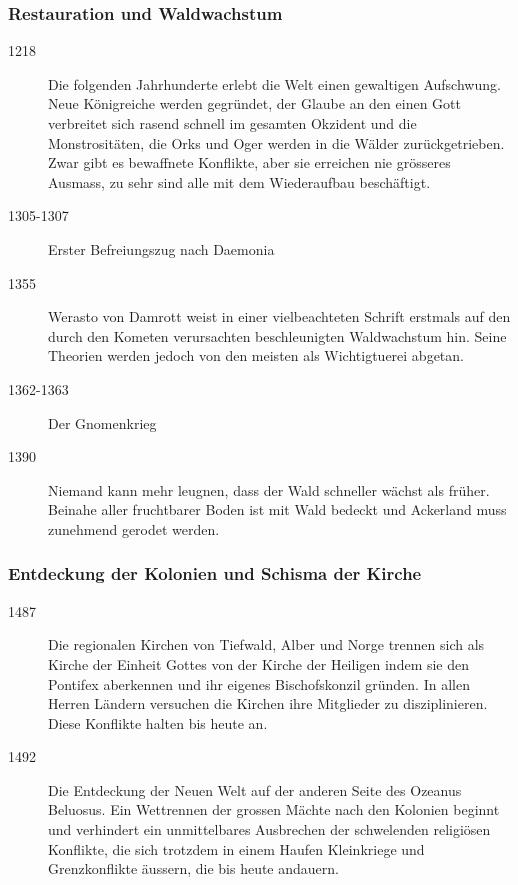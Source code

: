 \documentclass[12pt,twoside,twocolumn,openany]{book}
\begin{document}
	\subsubsection{Restauration und Waldwachstum}
	\begin{description}
		\item[1218] Die folgenden Jahrhunderte erlebt die Welt einen gewaltigen Aufschwung. Neue Königreiche werden gegründet, der Glaube an den einen Gott verbreitet sich rasend schnell im gesamten Okzident und die Monstrositäten, die Orks und Oger werden in die Wälder zurückgetrieben. Zwar gibt es bewaffnete Konflikte, aber sie erreichen nie grösseres Ausmass, zu sehr sind alle mit dem Wiederaufbau beschäftigt.
		\item[1305-1307] Erster Befreiungszug nach Daemonia
		\item[1355] Werasto von Damrott weist in einer vielbeachteten Schrift erstmals auf den durch den Kometen verursachten beschleunigten Waldwachstum hin. Seine Theorien werden jedoch von den meisten als Wichtigtuerei abgetan.
		\item[1362-1363] Der Gnomenkrieg
		\item[1390] Niemand kann mehr leugnen, dass der Wald schneller wächst als früher. Beinahe aller fruchtbarer Boden ist mit Wald bedeckt und Ackerland muss zunehmend gerodet werden.
	\end{description}
	
	\subsubsection{Entdeckung der Kolonien und Schisma der Kirche}
	\begin{description}
		\item[1487] Die regionalen Kirchen von Tiefwald, Alber und Norge trennen sich als Kirche der Einheit Gottes von der Kirche der Heiligen indem sie den Pontifex aberkennen und ihr eigenes Bischofskonzil gründen. In allen Herren Ländern versuchen die Kirchen ihre Mitglieder zu disziplinieren. Diese Konflikte halten bis heute an.
		\item[1492] Die Entdeckung der Neuen Welt auf der anderen Seite des Ozeanus Beluosus. Ein Wettrennen der grossen Mächte nach den Kolonien beginnt und verhindert ein unmittelbares Ausbrechen der schwelenden religiösen Konflikte, die sich trotzdem in einem Haufen Kleinkriege und Grenzkonflikte äussern, die bis heute andauern.
	\end{description}
\end{document}
